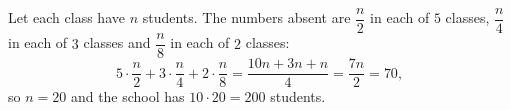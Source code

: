 Let each class have $n$ students. The numbers absent are $\dfrac n2$ in each of $5$ classes, $\dfrac n4$ in each of $3$ classes and $\dfrac n8$ in each of $2$ classes:
\[5\cdot\dfrac n2+3\cdot\dfrac n4+2\cdot\dfrac n8=\dfrac{10n+3n+n}{4}=\dfrac{7n}{2}=70,\]
so $n=20$ and the school has $10\cdot20=\boxed{200}$ students.

